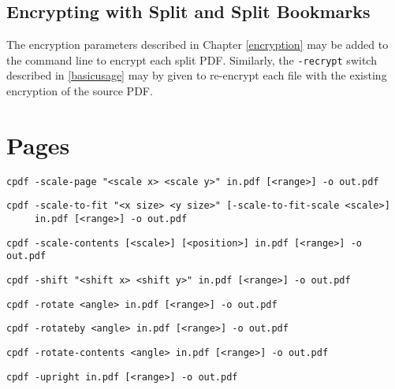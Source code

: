 \documentclass{book}
\begin{document}
\section{Encrypting with Split and Split Bookmarks}

The encryption parameters described in Chapter \ref{encryption} may be added to the command line to encrypt each split PDF. Similarly, the \texttt{-recrypt} switch described in \ref{basicusage} may by given to re-encrypt each file with the existing encryption of the source PDF. 
\pagestyle{empty}\thispagestyle{fancy}

\chapter{Pages}
\pagestyle{fancy}
  \label{pages}
  \begin{framed}
  \small\noindent\verb!cpdf -scale-page "<scale x> <scale y>" in.pdf [<range>] -o out.pdf!
   
  \vspace{1.5mm}
  \small\noindent\verb!cpdf -scale-to-fit "<x size> <y size>" [-scale-to-fit-scale <scale>]!\\    
        \noindent\verb!     in.pdf [<range>] -o out.pdf!


  \vspace{1.5mm}
  \small\noindent\verb!cpdf -scale-contents [<scale>] [<position>] in.pdf [<range>] -o out.pdf!
  
  \vspace{1.5mm}
  \small\noindent\verb!cpdf -shift "<shift x> <shift y>" in.pdf [<range>] -o out.pdf!

  \vspace{1.5mm}
  \small\noindent\verb!cpdf -rotate <angle> in.pdf [<range>] -o out.pdf!

  \vspace{1.5mm}
  \small\noindent\verb!cpdf -rotateby <angle> in.pdf [<range>] -o out.pdf!

  \vspace{1.5mm}
  \small\noindent\verb!cpdf -rotate-contents <angle> in.pdf [<range>] -o out.pdf!

  \vspace{1.5mm}
  \small\noindent\verb!cpdf -upright in.pdf [<range>] -o out.pdf!


\end{framed}
\end{document}
